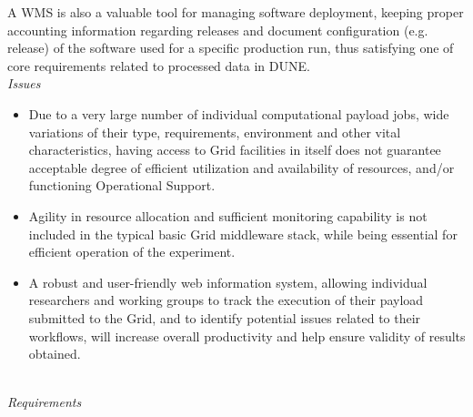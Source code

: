 A WMS is also a valuable tool for managing software deployment, keeping proper accounting information regarding releases and document configuration (e.g. release) of the software used for a specific production run, thus satisfying one of core requirements related to processed data in DUNE.
\ 
\\
\textit{Issues}
\begin{itemize}
	\item Due to a very large number of individual computational payload jobs, wide variations of their type, requirements, environment and other vital characteristics, having access to Grid facilities in itself does not guarantee acceptable degree of efficient utilization and availability of resources, and/or functioning Operational Support.
	
	\item Agility in resource allocation and sufficient monitoring capability is not included in the typical basic Grid middleware stack, while being essential for efficient operation of the experiment.
	\item A robust and user-friendly web information system, allowing individual researchers and working groups to track the execution of 
	their payload submitted to the Grid, and to identify potential issues related to their workflows, will increase overall productivity and help ensure validity of results obtained.
\end{itemize}
\ 
\\
\textit{Requirements}
